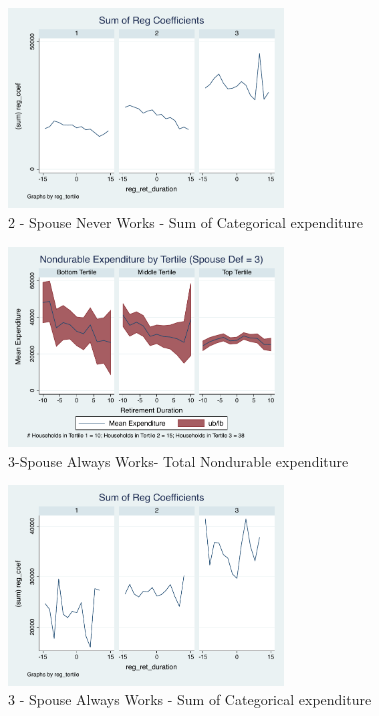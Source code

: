 \documentclass[11pt,onecolumn]{article}
\numberwithin{figure}{section}
\begin{document}
\begin{figure}[h]
	\caption{2 - Spouse Never Works - Sum of Categorical expenditure}
	\centering
	\includegraphics[width=0.65\textwidth]{../ConsumptionPostRetirement_by_SpouseDef_Cats/SumCoef/spouse_def_2.pdf}
\end{figure}

\clearpage

\begin{figure}[h]
	\caption{3-Spouse Always Works- Total Nondurable expenditure}
	\centering
	\includegraphics[width=0.65\textwidth]{../ConsumptionPostRetirement_by_SpouseDef/UnSmoothed/spouse_def_3.pdf}
\end{figure}

\begin{figure}[h]
	\caption{3 - Spouse Always Works - Sum of Categorical expenditure}
	\centering
	\includegraphics[width=0.65\textwidth]{../ConsumptionPostRetirement_by_SpouseDef_Cats/SumCoef/spouse_def_3.pdf}
\end{figure}
\clearpage
\end{document}
